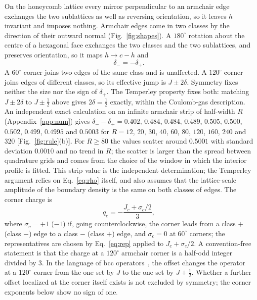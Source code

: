 \documentclass[aps,pre,twocolumn,superscriptaddress,nofootinbib,floatfix]{revtex4-2}
\begin{document}
On the honeycomb lattice every mirror perpendicular to an armchair edge exchanges the two sublattices as well as reversing orientation, so it leaves $h$ invariant and imposes nothing. Armchair edges come in two classes by the direction of their outward normal (Fig.~\ref{fig:shapes}). A $180^\circ$ rotation about the centre of a hexagonal face exchanges the two classes and the two sublattices, and preserves orientation, so it maps $h\to c-h$ and
\begin{equation}
\delta_-=-\delta_+ .
\end{equation}
A $60^\circ$ corner joins two edges of the same class and is unaffected. A $120^\circ$ corner joins edges of different classes, so its effective jump is $J\pm2\delta$. Symmetry fixes neither the size nor the sign of $\delta_+$. The Temperley property fixes both: matching $J\pm2\delta$ to $J\pm\tfrac12$ above gives $2\delta=\tfrac12$ exactly, within the Coulomb-gas description. An independent exact calculation on an infinite armchair strip of half-width $R$ (Appendix~\ref{app:num}) gives $\delta_--\delta_+=0.402$, $0.484$, $0.484$, $0.489$, $0.505$, $0.500$, $0.502$, $0.499$, $0.4995$ and $0.5003$ for $R=12$, $20$, $30$, $40$, $60$, $80$, $120$, $160$, $240$ and $320$ [Fig.~\ref{fig:rule}(b)]. For $R\ge80$ the values scatter around $0.5001$ with standard deviation $0.0010$ and no trend in $R$; the scatter is larger than the spread between quadrature grids and comes from the choice of the window in which the interior profile is fitted. This strip value is the independent determination; the Temperley argument relies on Eq.~\eqref{eq:rho} itself, and also assumes that the lattice-scale amplitude of the boundary density is the same on both classes of edges. The corner charge is
\begin{equation}
q_c=-\frac{J_c+\sigma_c/2}{3},
\label{eq:rule}
\end{equation}
where $\sigma_c=+1$ ($-1$) if, going counterclockwise, the corner leads from a class $+$ (class $-$) edge to a class $-$ (class $+$) edge, and $\sigma_c=0$ at $60^\circ$ corners; the representatives are chosen by Eq.~\eqref{eq:rep} applied to $J_c+\sigma_c/2$. A convention-free statement is that the charge at a $120^\circ$ armchair corner is a half-odd integer divided by $3$. In the language of bcc operators~\cite{Allegra2015}, the offset changes the operator at a $120^\circ$ corner from the one set by $J$ to the one set by $J\pm\tfrac12$. Whether a further offset localized at the corner itself exists is not excluded by symmetry; the corner exponents below show no sign of one.
\end{document}
